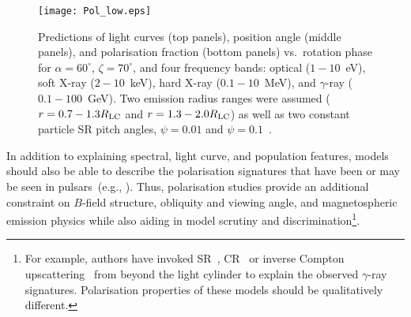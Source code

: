\documentclass{PoS}
\begin{document}
\begin{figure}[t]
  \begin{center}
  \texttt{[image: Pol\_low.eps]}
  \caption{Predictions of light curves (top panels), position angle (middle panels), and polarisation fraction (bottom panels) vs.\ rotation phase for $\alpha= 60^\circ$,
$\zeta = 70^\circ$, and four frequency bands: optical ($1-10$~eV), soft X-ray ($2-10$~keV), hard X-ray ($0.1-10$~MeV), and $\gamma$-ray ($0.1-100$~GeV). Two emission radius ranges were assumed ($r = 0.7-1.3R_{\rm LC}$ and $r = 1.3-2.0R_{\rm LC}$) as well as two constant particle SR pitch angles, $\psi=0.01$ and $\psi=0.1$~\cite{Harding_pol17}.}
  \label{fig:pol}
  \end{center}
\end{figure}
In addition to explaining spectral, light curve, and population features, models should also be able to describe the polarisation signatures that have been or may be seen in pulsars~(e.g., \cite{Kalapotharakos10,Petri05,Takata07}). Thus, polarisation studies provide an additional constraint on $B$-field structure, obliquity and viewing angle, and magnetospheric emission physics while also aiding in model scrutiny and discrimination\footnote{For example, authors have invoked SR~\cite{Petri05}, CR~\cite{Kalapotharakos14} or inverse Compton upscattering~\cite{Aharonian12,Lyutikov13} from beyond the light cylinder to explain the observed $\gamma$-ray signatures. Polarisation properties of these models should be qualitatively different.}.
\end{document}
